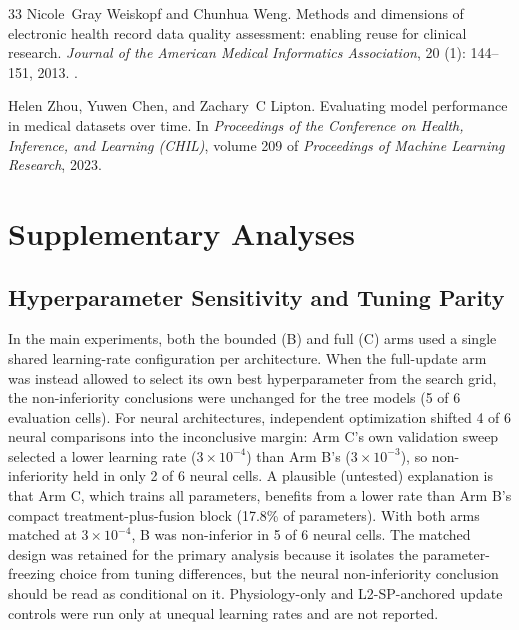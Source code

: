 \documentclass[10pt,a4paper,twocolumn]{article}
\begin{document}
\begin{thebibliography}{33}
		Nicole~Gray Weiskopf and Chunhua Weng.
		\newblock Methods and dimensions of electronic health record data quality
		assessment: enabling reuse for clinical research.
		\newblock \emph{Journal of the American Medical Informatics Association},
		20 (1): 144--151, 2013.
		\newblock {}.
		
		Helen Zhou, Yuwen Chen, and Zachary~C Lipton.
		\newblock Evaluating model performance in medical datasets over time.
		\newblock In \emph{Proceedings of the Conference on Health, Inference, and
			Learning (CHIL)}, volume 209 of \emph{Proceedings of Machine Learning
			Research}, 2023.
		
	\end{thebibliography}
	
	\appendix
	
	\section{Supplementary Analyses}
	
	\subsection{Hyperparameter Sensitivity and Tuning Parity}
	\label{sec:app_hp}
	In the main experiments, both the bounded (B) and full (C) arms used a single shared learning-rate configuration per architecture. When the full-update arm was instead allowed to select its own best hyperparameter from the search grid, the non-inferiority conclusions were unchanged for the tree models (5 of 6 evaluation cells). For neural architectures, independent optimization shifted 4 of 6 neural comparisons into the inconclusive margin: Arm C's own validation sweep selected a lower learning rate ($3\times10^{-4}$) than Arm B's ($3\times10^{-3}$), so non-inferiority held in only 2 of 6 neural cells. A plausible (untested) explanation is that Arm C, which trains all parameters, benefits from a lower rate than Arm B's compact treatment-plus-fusion block (17.8\% of parameters). With both arms matched at $3\times10^{-4}$, B was non-inferior in 5 of 6 neural cells. The matched design was retained for the primary analysis because it isolates the parameter-freezing choice from tuning differences, but the neural non-inferiority conclusion should be read as conditional on it. Physiology-only and L2-SP-anchored update controls were run only at unequal learning rates and are not reported.
	
\end{document}
